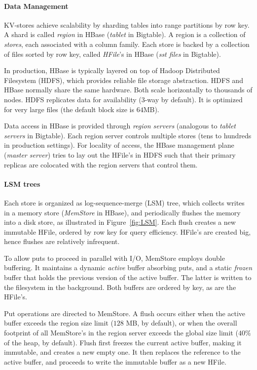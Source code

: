 \paragraph{Data Management}
KV-stores achieve scalability by sharding tables into range partitions by row key. 
A shard is called {\em region\/} in HBase (\emph{tablet} in Bigtable). 
A region is a collection of \emph{stores}, each associated with a column family. 
Each store is backed by a collection of files sorted by row key, called \emph{HFile}'s in HBase 
(\emph{sst files} in Bigtable). 

In production, HBase is typically layered on top of Hadoop Distributed Filesystem (HDFS), 
which provides reliable file storage abstraction. HDFS and HBase normally share the same hardware. 
Both scale horizontally to thousands of nodes. HDFS replicates data for availability (3-way by default). 
It is optimized for very large files (the default block size is $64$MB).

Data access in HBase is provided through {\em region servers} (analogous to {\em tablet servers}
in Bigtable). Each region server controls multiple stores (tens to hundreds in production settings). 
For locality of access, the HBase management plane (\emph{master server}) tries to lay out the 
HFile's in HDFS such that their primary replicas are colocated with the region servers that control them. 

\paragraph{LSM trees}
Each store is organized as log-sequence-merge (LSM) tree, which collects writes in a memory store 
(\emph{MemStore} in HBase), and periodically flushes the memory into a disk store, as illustrated in 
Figure~\ref{fig:LSM}. Each flush creates a new immutable HFile, ordered by row key for query efficiency. 
HFile's are created big, hence flushes are relatively infrequent. 

To allow puts to proceed in parallel with I/O, MemStore employs double buffering. 
It maintains a dynamic \emph{active} buffer absorbing puts, and a static \emph{frozen}
buffer that holds the previous version of the active buffer. The latter is written to the 
filesystem in the background. Both buffers are ordered by key, as are the HFile's.  

Put operations are directed to MemStore. A flush occurs either when the active buffer 
exceeds the region size limit ($128$ MB, by default), or when the overall footprint of all MemStore's
in the region server exceeds the global size limit ($40\%$ of the heap, by default). 
Flush first freezes the current active buffer, making it immutable, and creates a new empty one.
It then replaces the reference to the active buffer, and proceeds to write the immutable buffer 
as a new HFile. 

